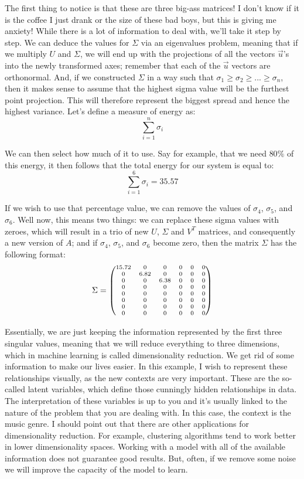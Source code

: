 \documentclass[a4,12pt,twosided,openany]{memoir}
\begin{document}
\par 
\indent
The first thing to notice is that these are three big-ass matrices! I don’t know if it is the coffee I just drank or the size of these bad boys, but this is giving me anxiety! While there is a lot of information to deal with, we’ll take it step by step. We can deduce the values for $\Sigma$ via an eigenvalues problem, meaning that if we multiply $U$ and $\Sigma$, we will end up with the projections of all the vectors $\overrightarrow{u}$’s  into the newly transformed axes; remember that each of the $\overrightarrow{u}$ vectors are orthonormal. And, if we constructed $\Sigma$ in a way such that $\sigma_1 \geq \sigma_2 \geq ...  \geq \sigma_n$, then it makes sense to assume that the highest sigma value will be the furthest point projection. This will therefore represent the biggest spread and hence the highest variance. Let’s define a measure of energy as:
\[\sum_{i=1}^n \sigma_i\]
\par 
\indent
We can then select how much of it to use. Say for example, that we need $80\%$ of this energy, it then follows that the total energy for our system is equal to:
\[\sum_{i=1}^6 \sigma_i = 35.57\]
\par 
\indent
If we wish to use that percentage value, we can remove the values of  $\sigma_4$, $\sigma_5$, and  $\sigma_6$. Well now, this means two things: we can replace these sigma values with zeroes, which will result in a trio of new $U$, $\Sigma$ and $V^T$  matrices, and consequently a new version of $A$; and if  $\sigma_4$, $\sigma_5$, and $\sigma_6$ become zero, then the matrix $\Sigma$ has the following format:
\[
\scriptsize{
\Sigma = 
\begin{pmatrix}
15.72 & 0 & 0 & 0 & 0 & 0 \\
0 & 6.82 & 0 & 0 & 0 & 0 \\
0 & 0 & 6.38 & 0 & 0 & 0 \\
0 & 0 & 0 & 0 & 0 & 0 \\
0 & 0 & 0 & 0 & 0 & 0 \\
0 & 0 & 0 & 0 & 0 & 0 \\
0 & 0 & 0 & 0 & 0 & 0 \\
0 & 0 & 0 & 0 & 0 & 0 \\
\end{pmatrix}
}
\]
\par 
\indent
Essentially, we are just keeping the information represented by the first three singular values, meaning that we will reduce everything to three dimensions, which in machine learning is called dimensionality reduction. We get rid of some information to make our lives easier. In this example, I wish to represent these relationships visually, as the new contexts are very important. These are the so-called latent variables, which define those cunningly hidden relationships in data. The interpretation of these variables is up to you and it’s usually linked to the nature of the problem that you are dealing with. In this case, the context is the music genre. I should point out that there are other applications for dimensionality reduction. For example, clustering algorithms tend to work better in lower dimensionality spaces. Working with a model with all of the available information does not guarantee good results. But, often, if we remove some noise we will improve the capacity of the model to learn.
\end{document}
